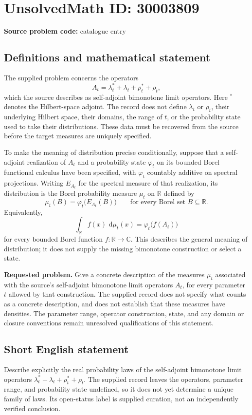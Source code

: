 \documentclass[11pt]{article}
\newcommand{\R}{\mathbb{R}}
\newcommand{\C}{\mathbb{C}}
\newcommand{\dd}{\,\mathrm{d}}
\begin{document}
\section*{UnsolvedMath ID: 30003809}
\textbf{Source problem code:} catalogue entry
\subsection{Definitions and mathematical statement}
The supplied problem concerns the operators
\[
A_t=\lambda_t^{*}+\lambda_t+\rho_t^{*}+\rho_t,
\]
which the source describes as self-adjoint bimonotone limit operators. Here \(^{*}\) denotes the Hilbert-space adjoint. The record does not define \(\lambda_t\) or \(\rho_t\), their underlying Hilbert space, their domains, the range of \(t\), or the probability state used to take their distributions. These data must be recovered from the source before the target measures are uniquely specified.

To make the meaning of distribution precise conditionally, suppose that a self-adjoint realization of \(A_t\) and a probability state \(\varphi_t\) on its bounded Borel functional calculus have been specified, with \(\varphi_t\) countably additive on spectral projections. Writing \(E_{A_t}\) for the spectral measure of that realization, its distribution is the Borel probability measure \(\mu_t\) on \(\R\) defined by
\[
\mu_t(B)=\varphi_t\bigl(E_{A_t}(B)\bigr)
\qquad\text{for every Borel set }B\subseteq\R.
\]
Equivalently,
\[
\int_{\R} f(x)\,\dd\mu_t(x)=\varphi_t\bigl(f(A_t)\bigr)
\]
for every bounded Borel function \(f:\R\to\C\). This describes the general meaning of distribution; it does not supply the missing bimonotone construction or select a state.

\textbf{Requested problem.} Give a concrete description of the measures \(\mu_t\) associated with the source's self-adjoint bimonotone limit operators \(A_t\), for every parameter \(t\) allowed by that construction. The supplied record does not specify what counts as a concrete description, and does not establish that these measures have densities. The parameter range, operator construction, state, and any domain or closure conventions remain unresolved qualifications of this statement.
\subsection{Short English statement}
Describe explicitly the real probability laws of the self-adjoint bimonotone limit operators \(\lambda_t^{*}+\lambda_t+\rho_t^{*}+\rho_t\). The supplied record leaves the operators, parameter range, and probability state undefined, so it does not yet determine a unique family of laws. Its open-status label is supplied curation, not an independently verified conclusion.
\end{document}
